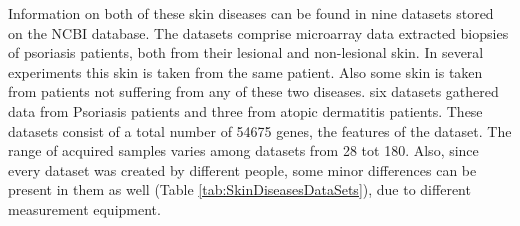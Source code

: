 \documentclass[10pt,a4paper]{report}
\begin{document}
	Information on both of these skin diseases can be found in nine datasets stored on the NCBI database\cite{edgar2002gene}. The datasets comprise microarray data extracted biopsies of psoriasis patients, both from their lesional and non-lesional skin. In several experiments this skin is taken from the same patient. Also some skin is taken from patients not suffering from any of these two diseases. six datasets gathered data from Psoriasis patients and three from atopic dermatitis patients. These datasets consist of a total number of 54675 genes, the features of the dataset. The range of acquired samples varies among datasets from 28 tot 180. Also, since every dataset was created by different people, some minor differences can be present in them as well (Table \ref{tab:SkinDiseasesDataSets}), due to different measurement equipment.
	
\end{document}
